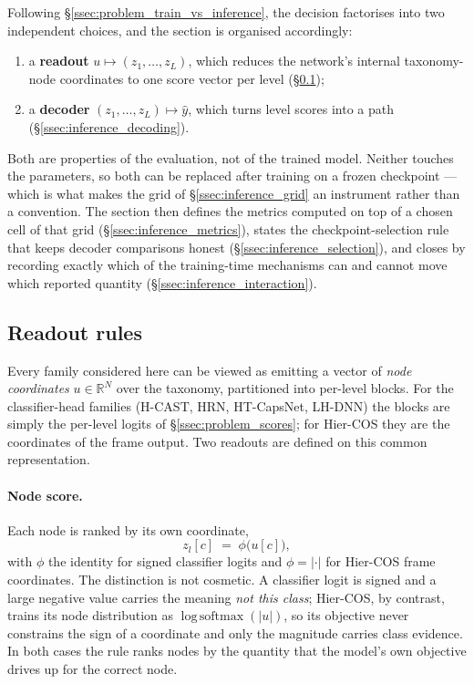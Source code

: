 Following \S\ref{ssec:problem_train_vs_inference}, the decision factorises into
two independent choices, and the section is organised accordingly:

\begin{enumerate}
    \item a \textbf{readout} $u\mapsto(z_1,\dots,z_L)$, which reduces the
    network's internal taxonomy-node coordinates to one score vector per level
    (\S\ref{ssec:inference_readout});
    \item a \textbf{decoder} $(z_1,\dots,z_L)\mapsto\hat y$, which turns level
    scores into a path (\S\ref{ssec:inference_decoding}).
\end{enumerate}

Both are properties of the evaluation, not of the trained model. Neither touches
the parameters, so both can be replaced after training on a frozen checkpoint ---
which is what makes the grid of \S\ref{ssec:inference_grid} an instrument rather
than a convention. The section then defines the metrics computed on top of a
chosen cell of that grid (\S\ref{ssec:inference_metrics}), states the
checkpoint-selection rule that keeps decoder comparisons honest
(\S\ref{ssec:inference_selection}), and closes by recording exactly which of the
training-time mechanisms can and cannot move which reported quantity
(\S\ref{ssec:inference_interaction}).

\subsection{Readout rules}
\label{ssec:inference_readout}

Every family considered here can be viewed as emitting a vector of
\emph{node coordinates} $u\in\mathbb{R}^{N}$ over the taxonomy, partitioned into
per-level blocks. For the classifier-head families (H-CAST, HRN, HT-CapsNet,
LH-DNN) the blocks are simply the per-level logits of
\S\ref{ssec:problem_scores}; for Hier-COS they are the coordinates of the frame
output. Two readouts are defined on this common representation.

\paragraph{Node score.} Each node is ranked by its own coordinate,
\[
z_l[c] \;=\; \phi\big(u[c]\big),
\]
with $\phi$ the identity for signed classifier logits and $\phi=\lvert\cdot\rvert$
for Hier-COS frame coordinates. The distinction is not cosmetic. A classifier
logit is signed and a large negative value carries the meaning \emph{not this
class}; Hier-COS, by contrast, trains its node distribution as
$\operatorname{log\,softmax}(\lvert u\rvert)$, so its objective never constrains
the sign of a coordinate and only the magnitude carries class evidence. In both
cases the rule ranks nodes by the quantity that the model's own objective drives
up for the correct node.

